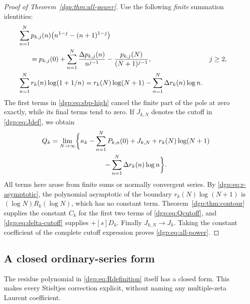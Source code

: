 \begin{proof}[Proof of Theorem~\ref{dgp:thm:all-power}]
Use the following \emph{finite} summation identities:
\begin{align}
 &\sum_{n=1}^N p_{k,j}(n)
               \bigl(n^{1-j}-(n+1)^{1-j}\bigr)\notag\\
 &\hspace{6mm}=p_{k,j}(0)+
           \sum_{n=1}^N\frac{\Delta p_{k,j}(n)}{n^{j-1}}
                    -\frac{p_{k,j}(N)}{(N+1)^{j-1}},
                  &&j\ge2,\label{dgp:eq:sbp-high}\\
 &\sum_{n=1}^N r_k(n)\log(1+1/n)
     =r_k(N)\log(N+1)-\sum_{n=1}^N\Delta r_k(n)\log n.
 \label{dgp:eq:sbp-simple}
\end{align}
The first terms in \eqref{dgp:eq:sbp-high} cancel the finite part of
the pole at zero exactly, while its final terms tend to zero.
If $J_{k,N}$ denotes the cutoff in \eqref{dgp:eq:Jdef}, we obtain
\begin{align}
 Q_k=\lim_{N\to\infty}\biggl\{
 &\kappa_k-\sum_{n=1}^N P_{k,n}(0)+J_{k,N}
       +r_k(N)\log(N+1)\notag\\
 &\hspace{12mm}-\sum_{n=1}^N\Delta r_k(n)\log n\biggr\}.
 \label{dgp:eq:Qcutoff}
\end{align}
All terms here arose from finite sums or normally convergent series.
By \eqref{dgp:eq:r-asymptotic}, the polynomial asymptotic of the boundary
$r_k(N)\log(N+1)$ is $(\log N)R_k(\log N)$, which has no constant
term.  Theorem~\ref{dgp:thm:contour} supplies the constant $C_k$ for the
first two terms of \eqref{dgp:eq:Qcutoff}, and \eqref{dgp:eq:delta-cutoff}
supplies $+[s]D_k$.  Finally $J_{k,N}\to J_k$.  Taking the constant
coefficient of the complete cutoff expression proves
\eqref{dgp:eq:all-power}.
\end{proof}

\subsection{A closed ordinary-series form}

The residue polynomial in \eqref{dgp:eq:Rdefinition} itself has a closed
form.  This makes every Stieltjes correction explicit, without naming
any multiple-zeta Laurent coefficient.

